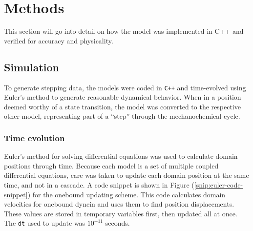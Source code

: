 \documentclass[
11pt, %
english, %
singlespacing, %
headsepline, %
chapterinoneline, %
]{MastersDoctoralThesis} %
\begin{document}

\newpage
\chapter{Methods}
\label{chap:Methods}
This section will go into detail on how the model was implemented in C++ and verified for accuracy and physicality.\\

\section{Simulation}
To generate stepping data, the models were coded in \verb|C++| and time-evolved using Euler's method to generate reasonable dynamical behavior. When in a position deemed worthy of a state transition, the model was converted to the respective other model, representing part of a ``step'' through the mechanochemical cycle.\\

\subsection{Time evolution}
Euler's method for solving differential equations was used to calculate domain positions through time. Because each model is a set of multiple coupled differential equations, care was taken to update each domain position at the same time, and not in a cascade. A code snippet is shown in Figure (\ref{snip:euler-code-snippet}) for the onebound updating scheme. This code calculates domain velocities for onebound dynein and uses them to find position displacements. These values are stored in temporary variables first, then updated all at once. The \verb|dt| used to update was $10^{-11}$ seconds.
\end{document}
